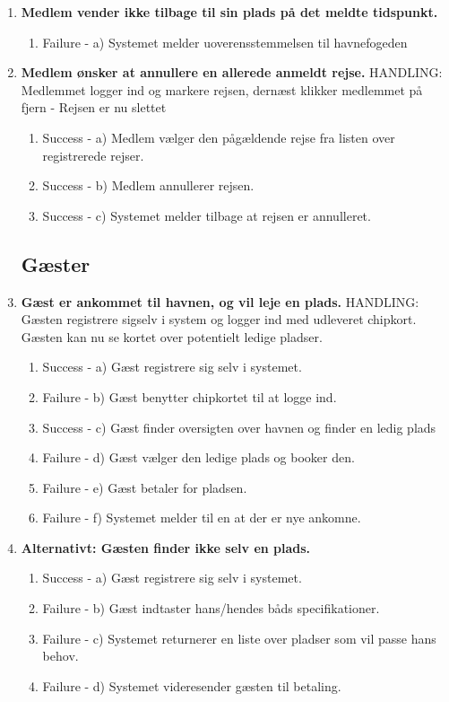 \begin{enumerate}
	\item{\bf{Medlem vender ikke tilbage til sin plads på det meldte tidspunkt.}}
	  \begin{enumerate}
			\item Failure -  a) Systemet melder uoverensstemmelsen til havnefogeden
	   \end{enumerate}

	\item{\bf{Medlem ønsker at annullere en allerede anmeldt rejse.}}
		HANDLING: Medlemmet logger ind og markere rejsen, dernæst klikker medlemmet på fjern - Rejsen er nu slettet
	  \begin{enumerate}
			\item Success -  a) Medlem vælger den pågældende rejse fra listen over registrerede rejser.
			\item Success -  b) Medlem annullerer rejsen.
			\item Success -  c) Systemet melder tilbage at rejsen er annulleret.
	   \end{enumerate}

\subsection{Gæster}
	\item{\bf{Gæst er ankommet til havnen, og vil leje en plads.}}
		HANDLING: Gæsten registrere sigselv i system og logger ind med udleveret chipkort. Gæsten kan nu se kortet over potentielt ledige pladser.
	  \begin{enumerate}
			\item Success -  a) Gæst registrere sig selv i systemet.
			\item Failure -  b) Gæst benytter chipkortet til at logge ind.
			\item Success -  c) Gæst finder oversigten over havnen og finder en ledig plads
			\item Failure -  d) Gæst vælger den ledige plads og booker den.
			\item Failure -  e) Gæst betaler for pladsen.
			\item Failure -  f) Systemet melder til en at der er nye ankomne.
	   \end{enumerate}
	   
	\item{\bf{Alternativt: Gæsten finder ikke selv en plads.}}
	  \begin{enumerate}
			\item Success - a) Gæst registrere sig selv i systemet.
			\item Failure - b) Gæst indtaster hans/hendes båds specifikationer.
			\item Failure - c) Systemet returnerer en liste over pladser som vil passe hans behov.
			\item Failure - d) Systemet videresender gæsten til betaling.
	   \end{enumerate}


\end{enumerate}
